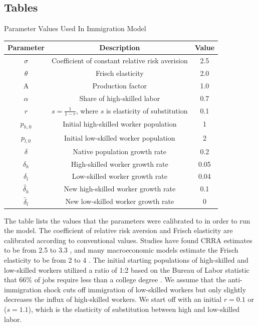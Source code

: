 \documentclass[11pt]{article}
\begin{document}
\subsection{Tables}

  \begin{center}
    \begin{threeparttable}
    \caption{Parameter Values Used In Immigration Model}
    \label{table:parameters}
      \begin{tabular}{c|c|c}
      \toprule
      \textbf{Parameter} & \textbf{Description} & \textbf{Value} \\
      \midrule
      $\sigma$ & Coefficient of constant relative risk averision& 2.5\\
      $\theta$ & Frisch elasticity& 2.0\\
      \midrule
      A & Production factor& 1.0 \\
      $\alpha$& Share of high-skilled labor & 0.7\\
      $r$& $s=\frac{1}{1-r}$, where $s$ is elasticity of substitution& 0.1\\
      \midrule
      $p_{h,0}$ & Initial high-skilled worker population &1\\
      $p_{l,0}$ & Initial low-skilled worker population & 2\\
      $\delta$& Native population growth rate & 0.2\\
      $\delta_h$& High-skilled worker growth rate & 0.05\\
      $\delta_l$& Low-skilled worker growth rate & 0.04\\
      $\tilde{\delta_h}$& New high-skilled worker growth rate& 0.1\\
      $\tilde{\delta_l}$& New low-skilled worker growth rate& 0\\
      \bottomrule
      \end{tabular}
      \begin{tablenotes}
      \item The table lists the values that the parameters were calibrated to in order to run the model. The coefficient of relative risk aversion and Frisch elasticity are calibrated according to conventional values. Studies have found CRRA estimates to be from 2.5 to 3.3 \cite{havranek}, and many macroeconomic models estimate the Frisch elasticity to be from 2 to 4 \cite{peterman}. The initial starting populations of high-skilled and low-skilled workers utilized a ratio of 1:2 based on the Bureau of Labor statistic that 66$\%$ of jobs require less than a college degree \cite{BLS}. We assume that the anti-immigration shock cuts off immigration of low-skilled workers but only slightly decreases the influx of high-skilled workers. We start off with an initial $r=0.1$ or ($s=1.1$), which is the elasticity of substitution between high and low-skilled labor.
      \end{tablenotes}
    \end{threeparttable}
  \end{center}
\end{document}
